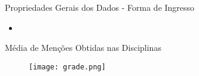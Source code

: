 \begin{frame}{Propriedades Gerais dos Dados - Forma de Ingresso}
    \begin{itemize}[itemsep=3ex]
        \item <gráfico mostrando forma de ingresso>
    \end{itemize}
\end{frame}

\begin{frame}{Média de Menções Obtidas nas Disciplinas}
    \begin{figure}[!ht]
        \centering
        \texttt{[image: grade.png]}
    \end{figure}
\end{frame}


